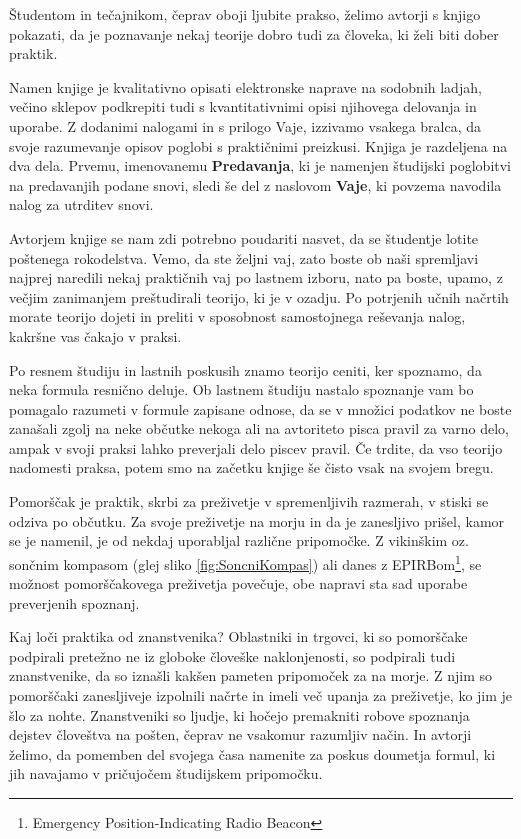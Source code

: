 %
\preface


Študentom in tečajnikom, čeprav oboji ljubite prakso, želimo avtorji s knjigo pokazati, da je poznavanje nekaj teorije dobro tudi za človeka, ki želi biti dober praktik.

Namen knjige je kvalitativno opisati elektronske naprave na sodobnih ladjah, večino sklepov podkrepiti tudi s kvantitativnimi opisi njihovega delovanja in uporabe. Z dodanimi nalogami in s prilogo Vaje, izzivamo vsakega bralca, da svoje razumevanje opisov poglobi s praktičnimi preizkusi. Knjiga je razdeljena na dva dela. Prvemu, imenovanemu \textbf{Predavanja}, ki je namenjen študijski poglobitvi na predavanjih podane snovi, sledi še del z naslovom \textbf{Vaje}, ki povzema navodila nalog za utrditev snovi.

Avtorjem knjige se nam zdi potrebno poudariti nasvet, da se študentje lotite poštenega rokodelstva. Vemo, da ste željni vaj, zato boste ob naši spremljavi najprej naredili nekaj praktičnih vaj po lastnem izboru, nato pa boste, upamo, z večjim zanimanjem preštudirali teorijo, ki je v ozadju. Po potrjenih učnih načrtih morate teorijo dojeti in preliti v sposobnost samostojnega reševanja nalog, kakršne vas čakajo v praksi. 

Po resnem študiju in lastnih poskusih znamo teorijo ceniti, ker spoznamo, da neka formula resnično deluje. Ob lastnem študiju nastalo spoznanje vam bo pomagalo razumeti v formule zapisane odnose, da se v množici podatkov ne boste zanašali zgolj na neke občutke nekoga ali na avtoriteto pisca pravil za varno delo, ampak v svoji praksi lahko preverjali delo piscev pravil. Če trdite, da vso teorijo nadomesti praksa, potem smo na začetku knjige še čisto vsak na svojem bregu.

Pomorščak je praktik, skrbi za preživetje v spremenljivih razmerah, v stiski se odziva po občutku. Za svoje preživetje na morju in da je zanesljivo prišel, kamor se je namenil, je od nekdaj uporabljal različne pripomočke. Z vikinškim oz. sončnim kompasom (glej sliko \ref{fig:SoncniKompas}) ali danes z EPIRBom\footnote{Emergency Position-Indicating Radio Beacon}, se možnost pomorščakovega preživetja povečuje, obe napravi sta sad uporabe preverjenih spoznanj. 

Kaj loči praktika od znanstvenika? Oblastniki in trgovci, ki so pomorščake podpirali pretežno ne iz globoke človeške naklonjenosti, so podpirali tudi znanstvenike, da so iznašli kakšen pameten pripomoček za na morje. Z njim so pomorščaki zanesljiveje izpolnili  načrte in imeli več upanja za preživetje, ko jim je šlo za nohte. Znanstveniki so ljudje, ki hočejo premakniti robove spoznanja dejstev človeštva na pošten, čeprav ne vsakomur razumljiv način. In avtorji želimo, da pomemben del svojega časa namenite za poskus doumetja formul, ki jih navajamo v pričujočem študijskem pripomočku.


